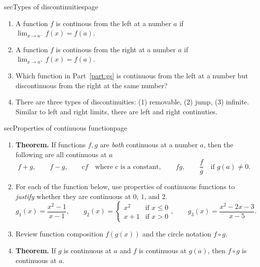 \documentclass[../main]{subfiles}
\begin{document}
\begin{outline}{sec}{Types of discontinuities}{page}
\begin{enumerate}
    \item A function \(f\) is continous from the left at a number \(a\) if \(\lim_{x \to a^{-}} f(x)= f(a)\).
    \item A function \(f\) is continous from the right at a number \(a\) if \(\lim_{x \to a^{+}} f(x)= f(a)\).
    \item Which function in Part~\ref{part:gs} is continuous from the left at a number but discontinuous from the right at the same number?
    \item {There are three types of discontinuities: (1) removable, (2) jump, (3) infinite. Similar to left and right limits, there are left and right continuties.}
  \end{enumerate}
\end{outline}


\begin{outline}{sec}{Properties of continuous function}{page}
  \label{act:properties}
  \begin{enumerate}
    \item \textbf{Theorem.} If functions \(f,g\) are \emph{both} continuous at a number \(a\), then the following are all continuous at \(a\)
          \[
            f+g,
            \hspace{2em} f-g,
            \hspace{2em} cf \quad\text{where }c \text{ is a constant},
            \hspace{2em} fg,
            \hspace{2em} \frac{f}{g}\quad\text{if } g(a) \ne 0.
          \]

    \item For each of the function below, use properties of continuous functions to \emph{justify} whether they are continuous at \(0\), \(1\), and \(2\).
          \[
            g_{1}(x) = \frac{x^{2} - 1}{x-1},
            \hspace{2em}
            g_{2}(x) =
            \begin{cases}
              x^{2} & \text{if } x \le 0 \\
              x + 1 & \text{if } x > 0
            \end{cases},
            \hspace{2em}
            g_{3}(x) = \frac{x^{2} - 2x - 3}{x - 5}.
          \]
    \item Review function composition \(f(g(x))\) and the circle notation \(f \circ g\).

    \item \textbf{Theorem.} If \(g\) is continuous at \(a\) and \(f\) is continuous at \(g(a)\), then \(f \circ g\) is continuous at \(a\).


\end{enumerate}
\end{outline}
\end{document}
